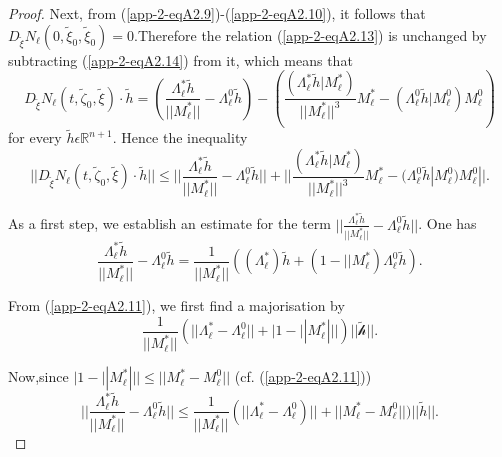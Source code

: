 \begin{proof}
Next, from (\ref{app-2-eqA2.9})-(\ref{app-2-eqA2.10}), it follows that
$D_{\widetilde{\xi}}N_{\ell} (0, \widetilde{\xi}_{0},
\widetilde{\xi}_{0}) = 0$.\break Therefore the relation (\ref{app-2-eqA2.13}) is unchanged
by subtracting (\ref{app-2-eqA2.14}) from it, which means that
$$
D_{\widetilde{\xi}}N_{\ell} (t, \widetilde{\zeta}_{0},
\widetilde{\xi}) \cdot \widetilde{h} = \left(\frac{\Lambda_{\ell}^{*}
  \widetilde{h}}{||M_{\ell}^{*}||} - \Lambda_{\ell}^{0}
\widetilde{h}\right) - \left(\frac{(\Lambda_{\ell}^{*} \widetilde{h} |
  M_{\ell}^{*})}{||M_{\ell}^{*}||^{3}} M_{\ell}^{*} -
(\Lambda_{\ell}^{0} \widetilde{h} | M_{\ell}^{0})M_{\ell}^{0}\right)
$$
for every $\widetilde{h} \epsilon \mathbb{R}^{n+1}$. Hence the
inequality
\begin{equation*}
||D_{\widetilde{\xi}}N_{\ell} (t, \widetilde{\zeta}_{0},
\widetilde{\xi}) \cdot \widetilde{h}|| \leq
||\frac{\Lambda_{\ell}^{*}\widetilde{h}}{||M_{\ell}^{*}||} -
\Lambda_{\ell}^{0} \widetilde{h}|| +
||\frac{(\Lambda_{\ell}^{*}\widetilde{h} |
  M_{\ell}^{*})}{||M_{\ell}^{*}||^{3}} M_{\ell}^{*} -
(\Lambda_{\ell}^{0} \widetilde{h} | M_{\ell}^{0})M_{\ell}^{0}||.\tag{A2.15}\label{app-2-eqA2.15}
\end{equation*}

As a first step, we establish an estimate for the term
$||\frac{\Lambda_{\ell}^{*} \widetilde{h}}{||M_{\ell}^{*}||} -
\Lambda_{\ell}^{0} \widetilde{h}||$. One has
$$
\frac{\Lambda_{\ell}^{*} \widetilde{h}}{||M_{\ell}^{*}||} -
\Lambda_{\ell}^{0} \widetilde{h} = \frac{1}{||M_{\ell}^{*}||}
((\Lambda_{\ell}^{*})\widetilde{h} + (1 - ||M_{\ell}^{*})
\Lambda_{\ell}^{0}\widetilde{h}). 
$$

From (\ref{app-2-eqA2.11}), we first find a majorisation by
$$
\frac{1}{||M_{\ell}^{*}||} \left(||\Lambda_{\ell}^{*} -
\Lambda_{\ell}^{0}|| + |1 - ||M_{\ell}^{*}|| |\right)
||\widetilde{\mathscr{h}}||. 
$$

Now,\pageoriginale since $|1 - ||M_{\ell}^{*}||| \leq ||M_{\ell}^{*} -
M_{\ell}^{0}||$ (cf. (\ref{app-2-eqA2.11}))
\begin{equation*}
||\frac{\Lambda_{\ell}^{*} \widetilde{h}}{||M_{\ell}^{*}||} -
\Lambda_{\ell}^{0} \widetilde{h}|| \leq \frac{1}{||M_{\ell}^{*}||}
(||\Lambda_{\ell}^{*} - \Lambda_{\ell}^{0})|| + ||M_{\ell}^{*} -
M_{\ell}^{0}||) ||\widetilde{h}||.\tag{A2.16}\label{app-2-eqA2.16}
\end{equation*}


\end{proof}
